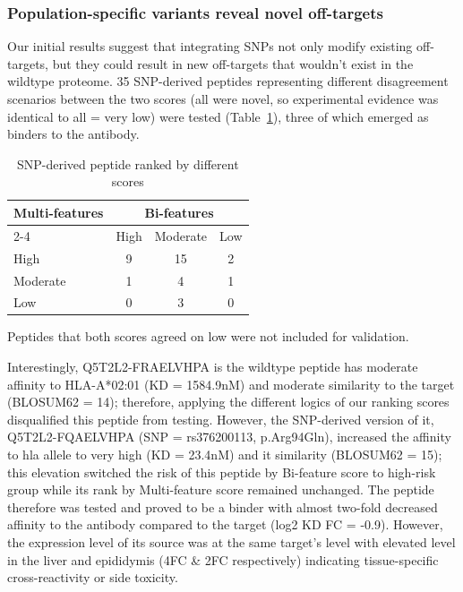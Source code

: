 \documentclass[unnumsec,webpdf,contemporary,large]{oup-authoring-template}%
\theoremstyle{thmstyleone}%
\theoremstyle{thmstyletwo}%
\theoremstyle{thmstylethree}%
\begin{document}
        \subsubsection{\textbf{Population-specific variants reveal novel off-targets}}
            Our initial results suggest that integrating SNPs not only modify existing off-targets, but they could result in new off-targets that wouldn’t exist in the wildtype proteome. 
            35 SNP-derived peptides representing different disagreement scenarios between the two scores (all were novel, so experimental evidence was identical to all = very low) were tested (Table~\ref{snp_validated}), three of which emerged as binders to the antibody.
            \begin{table}[!t]
                \caption{SNP-derived peptide ranked by different scores\label{snp_validated}}%
                \centering
                \begin{tabular*}{\columnwidth}{@{\extracolsep\fill}lccc@{\extracolsep\fill}}
                    \toprule
                    \multicolumn{1}{c}{\multirow{2}{*}{\textbf{Multi-features}}} & 
                    \multicolumn{3}{c}{\textbf{Bi-features}} \\
                    \cmidrule(lr){2-4}
                        & High & Moderate & Low \\
                    \midrule
                    High & 9 & 15 & 2 \\
                    Moderate & 1 & 4 & 1 \\
                    Low & 0 & 3 & 0 \\
                    \bottomrule
                \end{tabular*}
                \begin{tablenotes}%
                    \item Peptides that both scores agreed on low were not included for validation.
                \end{tablenotes}
            \end{table}
            Interestingly, Q5T2L2-FRAELVHPA is the wildtype peptide has moderate affinity to HLA-A*02:01 (KD = 1584.9nM) and moderate similarity to the target (BLOSUM62 = 14); therefore, applying the different logics of our ranking scores disqualified this peptide from testing. However, the SNP-derived version of it, Q5T2L2-FQAELVHPA (SNP = rs376200113, p.Arg94Gln), increased the affinity to hla allele to very high (KD = 23.4nM) and it similarity (BLOSUM62 = 15); this elevation switched the risk of this peptide by Bi-feature score to high-risk group while its rank by Multi-feature score remained unchanged. The peptide therefore was tested and proved to be a binder with almost two-fold decreased affinity to the antibody compared to the target (log2 KD FC = -0.9). However, the expression level of its source was at the same target’s level with elevated level in the liver and epididymis (4FC \& 2FC respectively) indicating tissue-specific cross-reactivity or side toxicity.
            
\end{document}

